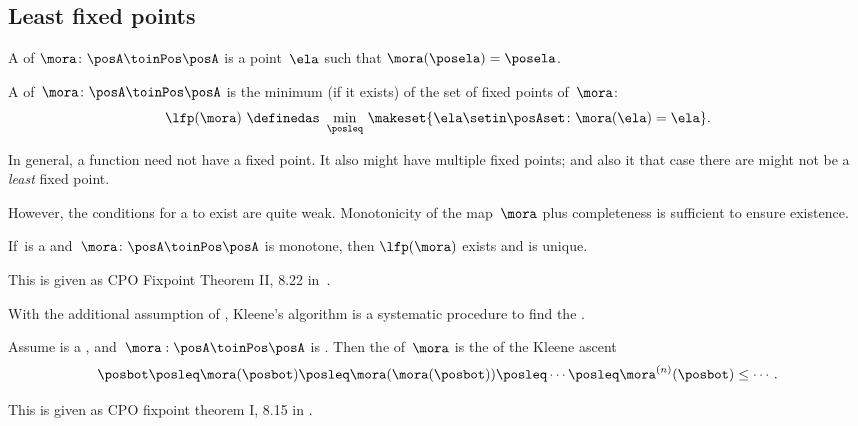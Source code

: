 \subsection{Least fixed points}

\begin{definition}
    \label{def:fixed-point}
    A  of $\mora\colon\posA\toinPos\posA$ is a point~$\ela$ such that $\mora(\posela)=\posela$.
\end{definition}

\begin{definition}
    \label{def:least-fixed-point}
    A  of~$\mora\colon\posA\toinPos\posA$ is the minimum (if it exists) of the set of fixed points of~$\mora$:
    \begin{equation}
        \label{eq:lfp-one}
        \lfp(\mora)\,\,\definedas\,\,\min_{\posleq}\,\makeset{\ela \setin\posAset \colon \mora(\ela)=\ela}.
    \end{equation}
\end{definition}

In general, a function need not have a fixed point.
It also might have multiple fixed points; and also it that case there are might not be a \emph{least} fixed point.

However, the conditions for a  to exist are quite weak.
%
Monotonicity of the map~$\mora$ plus completeness is sufficient to ensure existence.

\begin{lemma}
    \label{lem:CPO-fix-point-2}
    If~\posA is a \CPO and~$\mora\colon\posA\toinPos\posA$ is monotone, then $\lfp(\mora)$ exists and is unique.
\end{lemma}
This is given as CPO Fixpoint Theorem II, 8.22 in~\cite{davey02}.

With the additional assumption of , Kleene's algorithm is a systematic procedure to find the .

\begin{lemma}
    \label{lem:kleene-1}
    Assume \posA is a \CPO, and~$\mora:\linebreak[0]\posA\toinPos\posA$ is .
    Then the  of~$\mora$ is the  of the Kleene ascent  \begin{equation}
        \label{eq:kleene-iteration}
        \posbot\posleq \mora(\posbot)\posleq \mora(\mora(\posbot))\posleq\cdots\posleq \mora^{(n)}(\posbot)\leq\cdots.
    \end{equation}
\end{lemma}
This is given as CPO fixpoint theorem I, 8.15 in \cite{davey02}.

